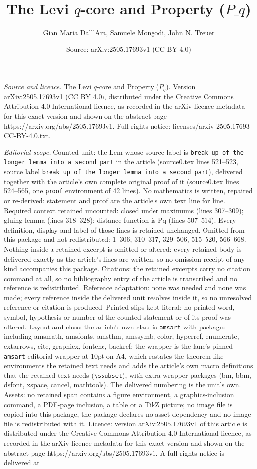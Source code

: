 \documentclass[10pt,a4paper]{amsart}
\title[The Levi $q$-core and Property ($P\_q$)]{The Levi $q$-core and Property ($P\_q$)}
\author{Gian Maria Dall'Ara, Samuele Mongodi, John N. Treuer}
\date{Source: arXiv:2505.17693v1 (CC BY 4.0)}
\begin{document}
\maketitle

\noindent\emph{Source and licence.} The Levi $q$-core and Property ($P_q$). Version arXiv:2505.17693v1 (CC BY 4.0), distributed under the Creative Commons Attribution 4.0 International licence, as recorded in the arXiv licence metadata for this exact version and shown on the abstract page https://arxiv.org/abs/2505.17693v1. Full rights notice: licenses/arxiv-2505.17693-CC-BY-4.0.txt.\par\smallskip

\noindent\textit{Editorial scope.} Counted unit: the Lem whose source label is \texttt{break up of the longer lemma into a second part} in the article (source0.tex lines 521--523, source label \texttt{break up of the longer lemma into a second part}), delivered together with the article's own complete original proof of it (source0.tex lines 524--565, one \texttt{proof} environment of 42 lines). No mathematics is written, repaired or re-derived: statement and proof are the article's own text line for line. Required context retained uncounted: closed under maximums (lines 307--309); gluing lemma (lines 318--328); distance function is Pq (lines 507--514). Every definition, display and label of those lines is retained unchanged. Omitted from this package and not redistributed: 1--306, 310--317, 329--506, 515--520, 566--668. Nothing inside a retained excerpt is omitted or altered: every retained body is delivered exactly as the article's lines are written, so no omission receipt of any kind accompanies this package. Citations: the retained excerpts carry no citation command at all, so no bibliography entry of the article is transcribed and no reference is redistributed. Reference adaptation: none was needed and none was made; every reference inside the delivered unit resolves inside it, so no unresolved reference or citation is produced. Printed slips kept literal: no printed word, symbol, hypothesis or number of the counted statement or of its proof was altered. Layout and class: the article's own class is \texttt{amsart} with packages including amsmath, amsfonts, amsthm, amssymb, color, hyperref, enumerate, extarrows, cite, graphicx, fontenc, backref; the wrapper is the lane's pinned \texttt{amsart} editorial wrapper at 10pt on A4, which restates the theorem-like environments the retained text needs and adds the article's own macro definitions that the retained text needs (\texttt{\textbackslash ssubset}), with extra wrapper packages (bm, bbm, dsfont, xspace, cancel, mathtools). The delivered numbering is the unit's own. Assets: no retained span contains a figure environment, a graphics-inclusion command, a PDF-page inclusion, a table or a TikZ picture; no image file is copied into this package, the package declares no asset dependency and no image file is redistributed with it. Licence: version arXiv:2505.17693v1 of this article is distributed under the Creative Commons Attribution 4.0 International licence, as recorded in the arXiv licence metadata for this exact version and shown on the abstract page https://arxiv.org/abs/2505.17693v1. A full rights notice is delivered at 
\end{document}
